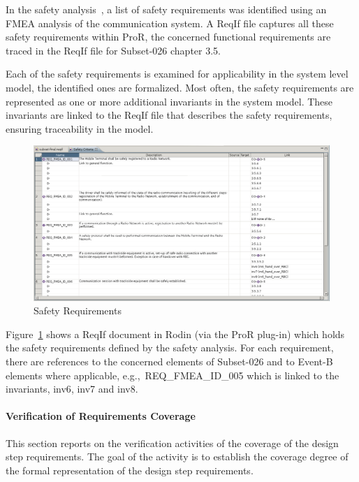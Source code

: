 In the safety analysis~\cite{safetyBrice}, a list of safety requirements was
identified using an FMEA analysis of the communication system. A ReqIf file
captures all these safety requirements within ProR, the concerned functional
requirements are traced in the ReqIf file for Subset-026 chapter 3.5.

Each of the safety requirements is examined for applicability in the system
level model, the identified ones are formalized. Most often, the safety
requirements are represented as one or more additional invariants in the system
model. These invariants are linked to the ReqIf file that describes the safety
requirements, ensuring traceability in the model.

\begin{figure}[ht]
  \centering
  \includegraphics[width=1\textwidth]{figures/ProRSafetyReq}
  \caption{Safety Requirements}
  \label{fig:pror-safety-req}
\end{figure}

Figure~\ref{fig:pror-safety-req} shows a ReqIf document in Rodin (via the ProR
plug-in) which holds the safety requirements defined by the safety analysis. For
each requirement, there are references to the concerned elements of Subset-026 and
to Event-B elements where applicable, e.g.,\ {\sf REQ\_FMEA\_ID\_005} which is
linked to the invariants, {\sf inv6}, {\sf inv7} and {\sf inv8}.


\paragraph{Verification of Requirements Coverage}
\label{sec:verif-requ-cover}

This section reports on the verification activities of the coverage of the
design step requirements. The goal of the activity is to establish the coverage
degree of the formal representation of the design step requirements.

